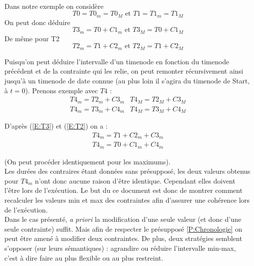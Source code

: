 \documentclass[10pt,a4paper]{article}
\begin{document}
\paragraph*{}
Dans notre exemple on considère \begin{equation} T0 = T0_m = T0_M \text{ et } T1 = T1_m = T1_M \end{equation}
On peut donc déduire \begin{equation}T3_m = T0 + C1_m \text{ et } T3_M = T0 + C1_M \label{E:T3}\end{equation}
De même pour T2 \begin{equation}T2_m = T1 + C2_m \text{ et } T2_M = T1 + C2_M \label{E:T2} \end{equation}

Puisqu'on peut déduire l'intervalle d'un timenode en fonction du timenode précédent et de la contrainte qui les relie, on peut remonter récursivement ainsi jusqu'à un timenode de date connue (au plus loin il s'agira du timenode de Start, à $t=0$). Prenons exemple avec $T4$ : 
\begin{eqnarray} 
T4_m = T2_m + C3_m & T4_M = T2_M + C3_M \\
T4_m = T3_m + C4_m & T4_M = T3_M + C4_M \nonumber
\label{E:coherence}
\end{eqnarray}

D'après (\ref{E:T3}) et (\ref{E:T2}) on a :
\begin{eqnarray} 
T4_m = T1 + C2_m + C3_m \\
T4_m = T0 + C1_m + C4_m \nonumber
\label{E:conjonction}
\end{eqnarray}

(On peut procéder identiquement pour les maximums). \\
Les durées des contraires étant données sans présupposé, les deux valeurs obtenus pour $T4_m$ n'ont donc aucune raison d'être identique. Cependant elles doivent l'être lors de l'exécution. Le but du ce document est donc de montrer comment recalculer les valeurs min et max des contraintes afin d'assurer une cohérence lors de l'exécution.\\

Dans le cas présenté, \textit{a priori} la modification d'une seule valeur (et donc d'une seule contrainte) suffit. Mais afin de respecter le présupposé \ref{P:Chronologie} on peut être amené à modifier deux contraintes. De plus, deux stratégies semblent s'opposer (sur leurs sémantiques) : agrandire ou réduire l'intervalle min-max, c'est à dire faire au plus flexible ou au plus restreint.
\end{document}
